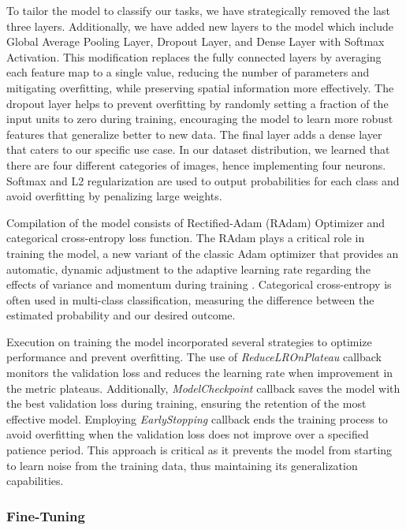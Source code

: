 To tailor the model to classify our tasks, we have strategically removed the last three layers. Additionally, we have added new layers to the model which include Global Average Pooling Layer, Dropout Layer, and Dense Layer with Softmax Activation. This modification replaces the fully connected layers by averaging each feature map to a single value, reducing the number of parameters and mitigating overfitting, while preserving spatial information more effectively. The dropout layer helps to prevent overfitting by randomly setting a fraction of the input units to zero during training, encouraging the model to learn more robust features that generalize better to new data. The final layer adds a dense layer that caters to our specific use case. In our dataset distribution, we learned that there are four different categories of images, hence implementing four neurons. Softmax and L2 regularization are used to output probabilities for each class and avoid overfitting by penalizing large weights.

Compilation of the model consists of Rectified-Adam (RAdam) Optimizer and categorical cross-entropy loss function. The RAdam plays a critical role in training the model, a new variant of the classic Adam optimizer that provides an automatic, dynamic adjustment to the adaptive learning rate regarding the effects of variance and momentum during training \cite{9259870}. Categorical cross-entropy is often used in multi-class classification, measuring the difference between the estimated probability and our desired outcome.

Execution on training the model incorporated several strategies to optimize performance and prevent overfitting. The use of \textit{ReduceLROnPlateau} callback monitors the validation loss and reduces the learning rate when improvement in the metric plateaus. Additionally, \textit{ModelCheckpoint} callback saves the model with the best validation loss during training, ensuring the retention of the most effective model. Employing \textit{EarlyStopping} callback ends the training process to avoid overfitting when the validation loss does not improve over a specified patience period. This approach is critical as it prevents the model from starting to learn noise from the training data, thus maintaining its generalization capabilities.


\subsubsection{Fine-Tuning}

